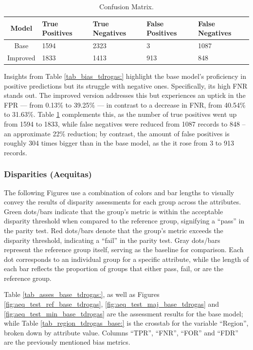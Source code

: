 \documentclass[twoside,11pt]{article}
\begin{document}
\begin{table}[!htb]
\centering
\begin{tabular}{|c|p{3cm}|p{3cm}|p{3cm}|p{3cm}|}
        \hline
        \textbf{Model} & \textbf{True Positives} & \textbf{True Negatives} & \textbf{False Positives} & \textbf{False Negatives}\\ \hline
        Base & 1594 & 2323 & 3 & 1087  \\ 
        Improved & 1833 & 1413 & 913 & 848  \\ 
        \hline
    \end{tabular}
\caption{Confusion Matrix.}
\label{tab_cm_tdrogas:}
\end{table}

Insights from Table \ref{tab_bias_tdrogas:} highlight the base model's proficiency in positive predictions but its struggle with negative ones. Specifically, its high FNR stands out. The improved version addresses this but experiences an uptick in the FPR — from 0.13\% to 39.25\% — in contrast to a decrease in FNR, from 40.54\% to 31.63\%. Table \ref{tab_cm_tdrogas:} complements this, as the number of true positives went up from 1594 to 1833, while false negatives were reduced from 1087 records to 848 -- an approximate 22\% reduction; by contrast, the amount of false positives is roughly 304 times bigger than in the base model, as the it rose from 3 to 913 records.

\subsubsection{Disparities (Aequitas)}

The following Figures use a combination of colors and bar lengths to visually convey the results of disparity assessments for each group across the attributes. Green dots/bars indicate that the group’s metric is within the acceptable disparity threshold when compared to the reference group, signifying a “pass” in the parity test. Red dots/bars denote that the group’s metric exceeds the disparity threshold, indicating a “fail” in the parity test. Gray dots/bars represent the reference group itself, serving as the baseline for comparison. Each dot corresponds to an individual group for a specific attribute, while the length of each bar reflects the proportion of groups that either pass, fail, or are the reference group. 

Table \ref{tab_asses_base_tdrogas:}, as well as Figures \ref{fig:aeq_test_ref_base_tdrogas}, \ref{fig:aeq_test_maj_base_tdrogas} and \ref{fig:aeq_test_min_base_tdrogas} are the assessment results for the base model; while Table \ref{tab_region_tdrogas_base:} is the crosstab for the variable ``Region'', broken down by attribute value. Columns ``TPR'', ``FNR'', ``FOR'' and ``FDR'' are the previously mentioned bias metrics.
\end{document}
